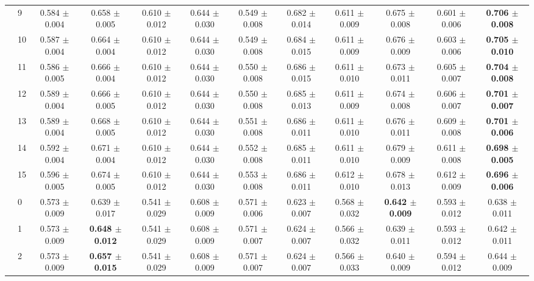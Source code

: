 \begin{table*}[t]
{\begin{tabular}{%
  ll
  @{\quad}
  c@{\hskip 4pt}c
  @{\quad\quad}
  c@{\hskip 4pt}c
  @{\quad\quad}
  c@{\hskip 4pt}c
  @{\quad\quad}
  c@{\hskip 4pt}c
  @{\quad\quad}
  c@{\hskip 4pt}c
}
        & 9 & 0.584 $\pm$ 0.004 & 0.658 $\pm$ 0.005 & 0.610 $\pm$ 0.012 & 0.644 $\pm$ 0.030 & 0.549 $\pm$ 0.008 & 0.682 $\pm$ 0.014 & 0.611 $\pm$ 0.009 & 0.675 $\pm$ 0.008 & 0.601 $\pm$ 0.006 & \textbf{0.706 $\pm$ 0.008} \\
        & 10 & 0.587 $\pm$ 0.004 & 0.664 $\pm$ 0.004 & 0.610 $\pm$ 0.012 & 0.644 $\pm$ 0.030 & 0.549 $\pm$ 0.008 & 0.684 $\pm$ 0.015 & 0.611 $\pm$ 0.009 & 0.676 $\pm$ 0.009 & 0.603 $\pm$ 0.006 & \textbf{0.705 $\pm$ 0.010} \\
        & 11 & 0.586 $\pm$ 0.005 & 0.666 $\pm$ 0.004 & 0.610 $\pm$ 0.012 & 0.644 $\pm$ 0.030 & 0.550 $\pm$ 0.008 & 0.686 $\pm$ 0.015 & 0.611 $\pm$ 0.010 & 0.673 $\pm$ 0.011 & 0.605 $\pm$ 0.007 & \textbf{0.704 $\pm$ 0.008} \\
        & 12 & 0.589 $\pm$ 0.004 & 0.666 $\pm$ 0.005 & 0.610 $\pm$ 0.012 & 0.644 $\pm$ 0.030 & 0.550 $\pm$ 0.008 & 0.685 $\pm$ 0.013 & 0.611 $\pm$ 0.009 & 0.674 $\pm$ 0.008 & 0.606 $\pm$ 0.007 & \textbf{0.701 $\pm$ 0.007} \\
        & 13 & 0.589 $\pm$ 0.004 & 0.668 $\pm$ 0.005 & 0.610 $\pm$ 0.012 & 0.644 $\pm$ 0.030 & 0.551 $\pm$ 0.008 & 0.686 $\pm$ 0.011 & 0.611 $\pm$ 0.010 & 0.676 $\pm$ 0.011 & 0.609 $\pm$ 0.008 & \textbf{0.701 $\pm$ 0.006} \\
        & 14 & 0.592 $\pm$ 0.004 & 0.671 $\pm$ 0.004 & 0.610 $\pm$ 0.012 & 0.644 $\pm$ 0.030 & 0.552 $\pm$ 0.008 & 0.685 $\pm$ 0.011 & 0.611 $\pm$ 0.010 & 0.679 $\pm$ 0.009 & 0.611 $\pm$ 0.008 & \textbf{0.698 $\pm$ 0.005} \\
        & 15 & 0.596 $\pm$ 0.005 & 0.674 $\pm$ 0.005 & 0.610 $\pm$ 0.012 & 0.644 $\pm$ 0.030 & 0.553 $\pm$ 0.008 & 0.686 $\pm$ 0.011 & 0.612 $\pm$ 0.010 & 0.678 $\pm$ 0.013 & 0.612 $\pm$ 0.009 & \textbf{0.696 $\pm$ 0.006} \\
\midrule
\assist{} & 0 & 0.573 $\pm$ 0.009 & 0.639 $\pm$ 0.017 & 0.541 $\pm$ 0.029 & 0.608 $\pm$ 0.009 & 0.571 $\pm$ 0.006 & 0.623 $\pm$ 0.007 & 0.568 $\pm$ 0.032 & \textbf{0.642 $\pm$ 0.009} & 0.593 $\pm$ 0.012 & 0.638 $\pm$ 0.011 \\
        & 1 & 0.573 $\pm$ 0.009 & \textbf{0.648 $\pm$ 0.012} & 0.541 $\pm$ 0.029 & 0.608 $\pm$ 0.009 & 0.571 $\pm$ 0.007 & 0.624 $\pm$ 0.007 & 0.566 $\pm$ 0.032 & 0.639 $\pm$ 0.011 & 0.593 $\pm$ 0.012 & 0.642 $\pm$ 0.011 \\
        & 2 & 0.573 $\pm$ 0.009 & \textbf{0.657 $\pm$ 0.015} & 0.541 $\pm$ 0.029 & 0.608 $\pm$ 0.009 & 0.571 $\pm$ 0.007 & 0.624 $\pm$ 0.007 & 0.566 $\pm$ 0.033 & 0.640 $\pm$ 0.009 & 0.594 $\pm$ 0.012 & 0.644 $\pm$ 0.009 \\

\end{tabular}}
\end{table*}
